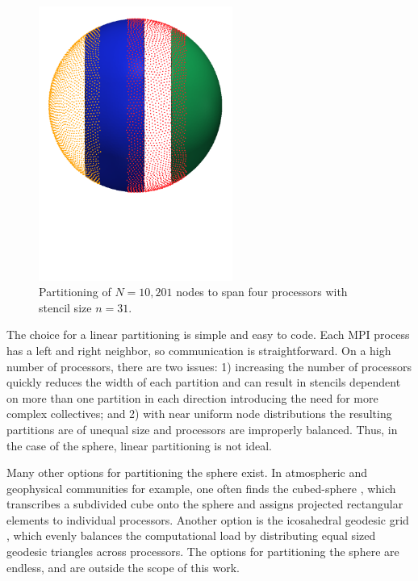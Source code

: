 \documentclass{report}
\begin{document}
\begin{figure}[ht!]
\begin{center}
\includegraphics[width=2.5in]{../figures/paper1/figures/vortex_rollup/4procs_N10K_n31.pdf}
\caption{Partitioning of $N=10,201$ nodes to span four processors with stencil size $n=31$. }
\label{fig:decomposed_sphere}
\end{center}
\end{figure}


The choice for a linear partitioning is simple and easy to code. Each MPI process has a left and right neighbor, so communication is straightforward. On a high number of processors, there are two issues: 1) increasing the number of processors quickly reduces the width of each partition and can result in stencils dependent on more than one partition in each direction introducing the need for more complex collectives; and 2) with near uniform node distributions the resulting partitions are of unequal size and processors are improperly balanced. Thus, in the case of the sphere, linear partitioning is not ideal. 


Many other options for partitioning the sphere exist. In atmospheric and geophysical communities for example, one often finds the cubed-sphere \cite{Ivan2011, Katta2012}, which transcribes a subdivided cube onto the sphere and assigns projected rectangular elements to individual processors. Another option is the icosahedral geodesic grid \cite{Randall2002}, which evenly balances the computational load by distributing equal sized geodesic triangles across processors. The options for partitioning the sphere are endless, and are outside the scope of this work. 
\end{document}
